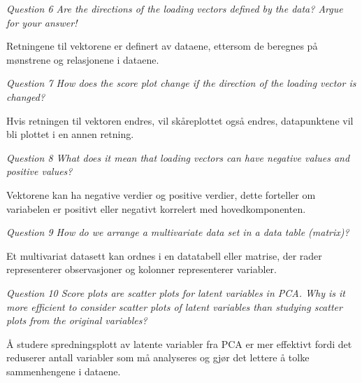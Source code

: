 \documentclass[onecolumn, 11pt]{article} %
\begin{document}
\bigskip

\textit{Question 6 Are the directions of the loading vectors defined by the data? Argue for your answer!}

Retningene til vektorene er definert av dataene, ettersom de beregnes på mønstrene og relasjonene i dataene.

\bigskip

\textit{Question 7 How does the score plot change if the direction of the loading vector is changed?}

Hvis retningen til vektoren endres, vil skåreplottet også endres, datapunktene vil bli plottet i en annen retning.

\bigskip

\textit{Question 8 What does it mean that loading vectors can have negative values and positive values?}

Vektorene kan ha negative verdier og positive verdier, dette forteller om variabelen er positivt eller negativt korrelert med hovedkomponenten.

\bigskip

\textit{Question 9 How do we arrange a multivariate data set in a data table (matrix)?}

Et multivariat datasett kan ordnes i en datatabell eller matrise, der rader representerer observasjoner og kolonner representerer variabler.

\bigskip

\textit{Question 10 Score plots are scatter plots for latent variables in PCA. Why is it more efficient to consider scatter plots of latent variables than studying scatter plots from the original variables?}

Å studere spredningsplott av latente variabler fra PCA er mer effektivt fordi det reduserer antall variabler som må analyseres og gjør det lettere å tolke sammenhengene i dataene.
\end{document}
